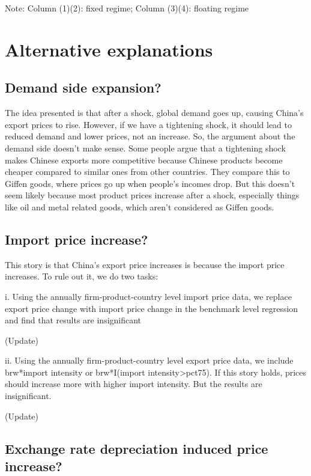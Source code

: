 \documentclass[12pt]{article}
\begin{document}
 
Note: Column (1)(2): fixed regime; Column (3)(4): floating regime


\section{Alternative explanations}

\subsection{Demand side expansion?}

The idea presented is that after a shock, global demand goes up, causing China's export prices to rise. However, if we have a tightening shock, it should lead to reduced demand and lower prices, not an increase. So, the argument about the demand side doesn't make sense. Some people argue that a tightening shock makes Chinese exports more competitive because Chinese products become cheaper compared to similar ones from other countries. They compare this to Giffen goods, where prices go up when people's incomes drop. But this doesn't seem likely because most product prices increase after a shock, especially things like oil and metal related goods, which aren't considered as Giffen goods.

\subsection{Import price increase?}

This story is that China’s export price increases is because the import price increases. To rule out it, we do two tasks:

i. Using the annually firm-product-country level import price data, we replace export price change with import price change in the benchmark level regression and find that results are insignificant

(Update)

ii. Using the annually firm-product-country level export price data, we include brw*import intensity or brw*I(import intensity>pct75). If this story holds, prices should increase more with higher import intensity. But the results are insignificant.

(Update)

\subsection{Exchange rate depreciation induced price increase?}
\end{document}
